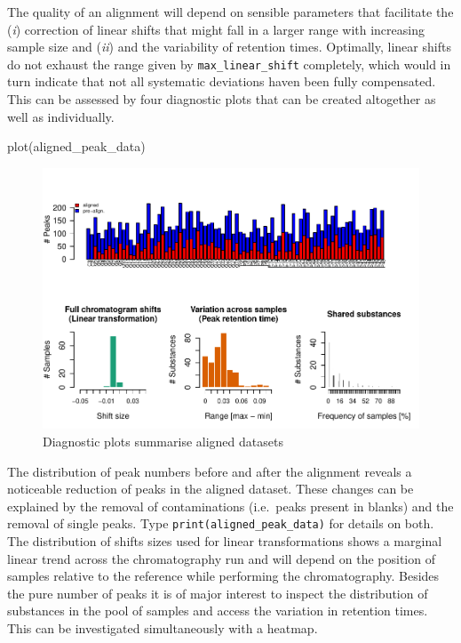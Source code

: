 The quality of an alignment will depend on sensible parameters that
facilitate the (\emph{i}) correction of linear shifts that might fall in
a larger range with increasing sample size and (\emph{ii}) and the
variability of retention times. Optimally, linear shifts do not exhaust
the range given by \texttt{max\_linear\_shift} completely, which would
in turn indicate that not all systematic deviations haven been fully
compensated. This can be assessed by four diagnostic plots that can be
created altogether as well as individually.

\begin{Schunk}
\begin{Sinput}
plot(aligned_peak_data)
\end{Sinput}
\begin{figure}

{\centering \includegraphics{ottensmann-stoffel-hoffman_files/figure-latex/unnamed-chunk-7-1} 

}

\caption[Diagnostic plots summarise aligned datasets]{Diagnostic plots summarise aligned datasets}\label{fig:unnamed-chunk-7}
\end{figure}
\end{Schunk}

The distribution of peak numbers before and after the alignment reveals
a noticeable reduction of peaks in the aligned dataset. These changes
can be explained by the removal of contaminations (i.e.~peaks present in
blanks) and the removal of single peaks. Type
\texttt{print(aligned\_peak\_data)} for details on both. The
distribution of shifts sizes used for linear transformations shows a
marginal linear trend across the chromatography run and will depend on
the position of samples relative to the reference while performing the
chromatography. Besides the pure number of peaks it is of major interest
to inspect the distribution of substances in the pool of samples and
access the variation in retention times. This can be investigated
simultaneously with a heatmap.


